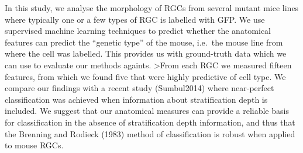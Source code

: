 \documentclass[11pt,article,oneside]{memoir}
\begin{document}
In this study, we analyse the morphology of RGCs from several mutant
mice lines where typically one or a few types of RGC is labelled with
GFP. We use supervised machine learning techniques to predict whether
the anatomical features can predict the ``genetic type'' of the mouse,
i.e.~the mouse line from where the cell was labelled. This provides us
with ground-truth data which we can use to evaluate our methods againts.
\textgreater{}From each RGC we measured fifteen features, from which we
found five that were highly predictive of cell type. We compare our
findings with a recent study (Sumbul2014) where near-perfect
classification was achieved when information about stratification depth
is included. We suggest that our anatomical measures can provide a
reliable basis for classification in the absence of stratification depth
information, and thus that the Brenning and Rodieck (1983) method of
classification is robust when applied to mouse RGCs.
\end{document}
